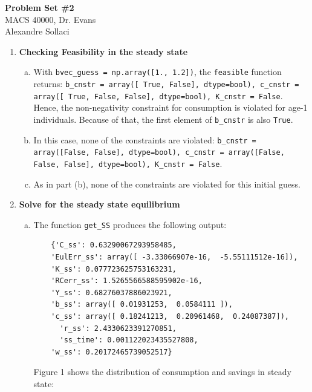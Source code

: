 \documentclass[letterpaper,12pt]{article}
\theoremstyle{definition}
\begin{document}
\begin{flushleft}
   \textbf{\large{Problem Set \#2}} \\
   MACS 40000, Dr. Evans \\
   Alexandre Sollaci
\end{flushleft}

\vspace{5mm}

\noindent\begin{enumerate}
   \item \textbf{Checking Feasibility in the steady state}
	\begin{enumerate}[(a)]
		\item With \texttt{bvec\_guess = np.array([1., 1.2])}, the \texttt{feasible} function returns:
		 \texttt{b\_cnstr = array([ True, False], dtype=bool), c\_cnstr = array([ True, False, False], dtype=bool), K\_cnstr = False}. \linebreak
		 Hence, the non-negativity constraint for consumption is violated for age-1 individuals. Because of that, the first element of \texttt{b\_cnstr} is also \texttt{True}.
		 
		 \item In this case, none of the constraints are violated: \hfill \hfill \linebreak
		 \texttt{b\_cnstr = array([False, False], dtype=bool), c\_cnstr = array([False, False, False], dtype=bool), K\_cnstr = False}.
		 
		\item As in part (b), none of the constraints are violated for this initial guess. 
		 
	\end{enumerate}
		
		
   \item \textbf{Solve for the steady state equilibrium}
   \begin{enumerate}[(a)]
   \item The function \texttt{get\_SS} produces the following output:
   
   \begin{verbatim}
   	{'C_ss': 0.63290067293958485,
 	'EulErr_ss': array([ -3.33066907e-16,  -5.55111512e-16]),
 	'K_ss': 0.077723625753163231,
 	'RCerr_ss': 1.5265566588595902e-16,
 	'Y_ss': 0.68276037886023921,
 	'b_ss': array([ 0.01931253,  0.0584111 ]),
 	'c_ss': array([ 0.18241213,  0.20961468,  0.24087387]),
	  'r_ss': 2.4330623391270851,
	  'ss_time': 0.001122023435527808,
 	'w_ss': 0.20172465739052517}
	\end{verbatim}    
Figure 1 shows the distribution of consumption and savings in steady state:
	

\end{enumerate}
\end{enumerate}
\end{document}
